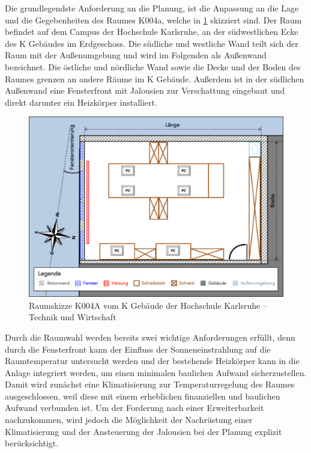 Die grundlegendste Anforderung an die Planung, ist die Anpassung an die Lage und die Gegebenheiten des Raumes K004a, welche in \ref{fig:skizzek004a} skizziert sind. Der Raum befindet auf dem Campus der Hochschule Karlsruhe, an der südwestlichen Ecke des K Gebäudes im Erdgeschoss. Die südliche und westliche Wand teilt sich der Raum mit der Außenumgebung und wird im Folgenden als Außenwand bezeichnet. Die östliche und nördliche Wand sowie die Decke und der Boden des Raumes grenzen an andere Räume im K Gebäude. Außerdem ist in der südlichen Außenwand eine Fensterfront mit Jalousien zur Verschattung eingebaut und direkt darunter ein Heizkörper installiert.

\begin{figure}
\centering
\includegraphics[width=\textwidth]{abbildungen/20160102_k004a}
\caption[Raumskizze K004A vom K Gebäude der Hochschule Karlsruhe -- Technik und Wirtschaft]{Raumskizze K004A vom K Gebäude der Hochschule Karlsruhe -- Technik und Wirtschaft}
\label{fig:skizzek004a}
\end{figure}

Durch die Raumwahl werden bereits zwei wichtige Anforderungen erfüllt, denn durch die Fensterfront kann der Einfluss der Sonneneinstrahlung auf die Raumtemperatur untersucht werden und der bestehende Heizkörper kann in die Anlage integriert werden, um einen minimalen baulichen Aufwand sicherzustellen. Damit wird zunächst eine Klimatisierung zur Temperaturregelung des Raumes ausgeschlossen, weil diese mit einem erheblichen finanziellen und baulichen Aufwand verbunden ist. Um der Forderung nach einer Erweiterbarkeit nachzukommen, wird jedoch die Möglichkeit der Nachrüstung einer Klimatisierung und der Ansteuerung der Jalousien bei der Planung explizit berücksichtigt.

